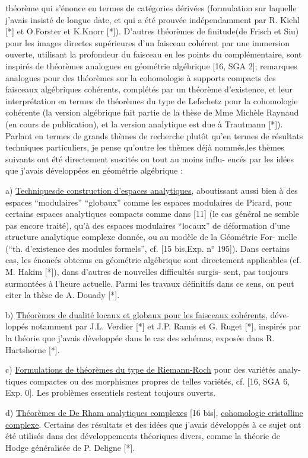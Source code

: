 
théorème qui s'énonce en termes de catégories dérivées (formulation sur laquelle
j'avais insisté de longue date, et qui a été prouvée indépendamment par R. Kiehl
[*] et O.Forster et K.Knorr [*]). D'autres théorèmes de finitude(de Frisch et Siu)
pour les images directes supérieures d'un faisceau cohérent par une immersion
ouverte, utilisant la profondeur du faisceau en les points du complémentaire,
sont inspirés de théorèmes analogues en géométrie algébrique [16, SGA 2];
remarques analogues pour des théorèmes sur la cohomologie à supports compacts
des faisceaux algébriques cohérents, complétés par un théorème d'existence,
et leur interprétation en termes de théorèmes du type de Lefschetz pour la
cohomologie cohérente (la version algébrique fait partie de la thèse de Mme
Michèle Raynaud (en cours de publication), et la version analytique est due
à Trautmann [*]). Parlant en termes de grands thèmes de recherche plutôt qu'en
termes de résultats techniques particuliers, je pense qu'outre les thèmes déjà
nommés,les thèmes suivants ont été directement suscités ou tout au moins influ-%
encés par les idées que j'avais développées en géométrie algébrique :

a) \uline{Techniquesde construction d'espaces analytiques}, aboutissant aussi bien à
des espaces ``modulaires'' ``globaux'' comme les espaces modulaires de Picard,
pour certains espaces analytiques compacts comme dans [11] (le cas général ne
semble pas encore traité), qu'à des espaces modulaires ``locaux'' de déformation
d'une structure analytique complexe donnée, ou au modèle de la Géométrie For-%
melle (``th. d'existence des modules formels'', cf. [15 bis,Exp. n° 195]).
Dans certains cas, les énoncés obtenus en géométrie algébrique sont directement
applicables (cf. M. Hakim [*]), dans d'autres de nouvelles difficultés surgis-%
sent, pas toujours surmontées à l'heure actuelle. Parmi les travaux définitifs
dans ce sens, on peut citer la thèse de A. Douady [*].

b) \uline{Théorèmes de dualité locaux et globaux pour les faisceaux cohérents}, déve-%
loppés notamment par J.L. Verdier [*] et J.P. Ramis et G. Ruget [*], inspirés
par la théorie que j'avais développée dans le cas des schémas, exposée dans
R. Hartshorne [*].

c) \uline{Formulations de théorèmes du type de Riemann-Roch} pour des variétés analy-%
tiques compactes ou des morphismes propres de telles variétés, cf. [16, SGA 6,
Exp. 0]. Les problèmes essentiels restent toujours ouverts.

d) \uline{Théorèmes de De Rham analytiques complexes} [16 bis], \uline{cohomologie cristalline}
\uline{complexe}. Certains des résultats et des idées que j'avais développés à ce
sujet ont été utilisés dans des développements théoriques divers, comme la
théorie de Hodge généralisée de P. Deligne [*].

